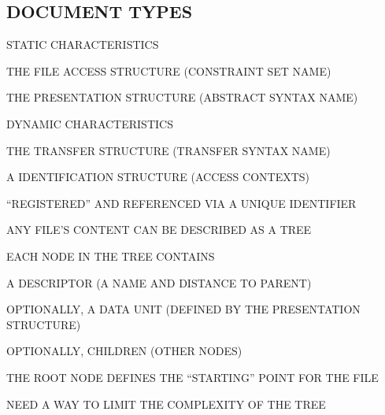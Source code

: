 \begin{bwslide}
\part*	{DOCUMENT TYPES}\bf

\begin{nrtc}
\item	STATIC CHARACTERISTICS
    \begin{nrtc}
    \item	THE FILE ACCESS STRUCTURE (CONSTRAINT SET NAME)

    \item	THE PRESENTATION STRUCTURE (ABSTRACT SYNTAX NAME)
    \end{nrtc}

\item	DYNAMIC CHARACTERISTICS
    \begin{nrtc}
    \item	THE TRANSFER STRUCTURE (TRANSFER SYNTAX NAME)

    \item	A IDENTIFICATION STRUCTURE (ACCESS CONTEXTS)
    \end{nrtc}

\item	``REGISTERED'' AND REFERENCED VIA A UNIQUE IDENTIFIER
\end{nrtc}
\end{bwslide}


\begin{bwslide}

\begin{nrtc}
\item	ANY FILE'S CONTENT CAN BE DESCRIBED AS A TREE

\item	EACH NODE IN THE TREE CONTAINS
    \begin{nrtc}
    \item	A DESCRIPTOR (A NAME AND DISTANCE TO PARENT)

    \item	OPTIONALLY, A DATA UNIT (DEFINED BY THE PRESENTATION STRUCTURE)

    \item	OPTIONALLY, CHILDREN (OTHER NODES)
    \end{nrtc}

\item	THE ROOT NODE DEFINES THE ``STARTING'' POINT FOR THE FILE

\item	NEED A WAY TO LIMIT THE COMPLEXITY OF THE TREE
\end{nrtc}
\end{bwslide}


